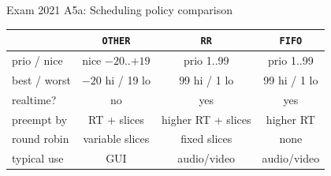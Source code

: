 \begin{example2}{Exam 2021 A5a: Scheduling policy comparison}
    {\footnotesize\setlength{\tabcolsep}{4pt}%
    \begin{tabular}{l|c|c|c}
         & \texttt{OTHER} & \texttt{RR} & \texttt{FIFO} \\\hline
        prio / nice & nice $-20$..$+19$ & prio 1..99 & prio 1..99 \\
        best / worst & $-20$ hi / 19 lo & 99 hi / 1 lo & 99 hi / 1 lo \\
        realtime? & no & yes & yes \\
        preempt by & RT + slices & higher RT + slices & higher RT \\
        round robin & variable slices & fixed slices & none \\
        typical use & GUI & audio/video & audio/video \\
    \end{tabular}}
\end{example2}

\raggedcolumns
